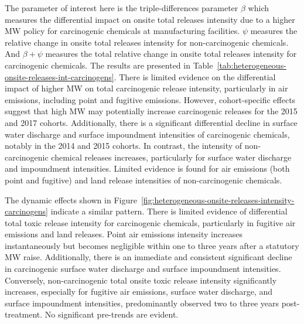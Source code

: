 \documentclass[12pt, english]{article}
\begin{document}
    The parameter of interest here is the triple-differences parameter $\beta$ which measures the differential impact on onsite total releases intensity due to a higher MW policy for carcinogenic chemicals at manufacturing facilities. $\psi$ measures the relative change in onsite total releases intensity for non-carcinogenic chemicals. And $\beta + \psi$ measures the total relative change in onsite total releases intensity for carcinogenic chemicals. The results are presented in Table~\ref{tab:heterogeneous-onsite-releases-int-carcinogens}. There is limited evidence on the differential impact of higher MW on total carcinogenic release intensity, particularly in air emissions, including point and fugitive emissions. However, cohort-specific effects suggest that high MW may potentially increase carcinogenic releases for the 2015 and 2017 cohorts. Additionally, there is a significant differential decline in surface water discharge and surface impoundment intensities of carcinogenic chemicals, notably in the 2014 and 2015 cohorts. In contrast, the intensity of non-carcinogenic chemical releases increases, particularly for surface water discharge and impoundment intensities. Limited evidence is found for air emissions (both point and fugitive) and land release intensities of non-carcinogenic chemicals.
    

    The dynamic effects shown in Figure~\ref{fig:heterogeneous-onsite-releases-intensity-carcinogens} indicate a similar pattern. There is limited evidence of differential total toxic release intensity for carcinogenic chemicals, particularly in fugitive air emissions and land releases. Point air emissions intensity increases instantaneously but becomes negligible within one to three years after a statutory MW raise. Additionally, there is an immediate and consistent significant decline in carcinogenic surface water discharge and surface impoundment intensities. Conversely, non-carcinogenic total onsite toxic release intensity significantly increases, especially for fugitive air emissions, surface water discharge, and surface impoundment intensities, predominantly observed two to three years post-treatment. No significant pre-trends are evident.
\end{document}
